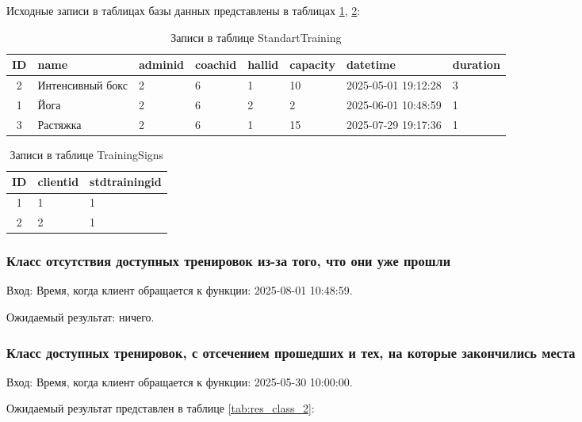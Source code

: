 Исходные записи в таблицах базы данных представлены в таблицах \ref{tab:StandartTraining_db_screen},
\ref{tab:trainingsigns_db_screen}:

\begin{table}[H]
	\centering
	\caption{Записи в таблице StandartTraining}
	\begin{tabular}{|c|p{2.7cm}|p{1.6cm}|p{1.6cm}|p{1.2cm}|p{1.6cm}|p{2.5cm}|p{1.6cm}|}
	\hline
	ID & name & adminid & coachid & hallid & capacity & datetime & duration \\
	\hline
	2 & Интенсивный бокс & 2 & 6 & 1 & 10 & 2025-05-01 19:12:28 & 3 \\
	\hline
	1 & Йога & 2 & 6 & 2 & 2 & 2025-06-01 10:48:59 & 1 \\
	\hline
	3 & Растяжка & 2 & 6 & 1 & 15 & 2025-07-29 19:17:36 & 1 \\
	\hline
	\end{tabular}
	\label{tab:StandartTraining_db_screen}
\end{table}

\begin{table}[H]
	\centering
	\caption{Записи в таблице TrainingSigns}
	\begin{tabular}{|c|p{7.5cm}|p{7.5cm}|}
	\hline
	ID & clientid & stdtrainingid \\
	\hline
	1 & 1 & 1 \\
	\hline
	2 & 2 & 1 \\
	\hline
	\end{tabular}
	\label{tab:trainingsigns_db_screen}
\end{table}

\subsubsection{Класс отсутствия доступных тренировок из-за того, что они уже прошли}

Вход: Время, когда клиент обращается к функции: 2025-08-01 10:48:59.

Ожидаемый результат: ничего.

\subsubsection{Класс доступных тренировок, с отсечением прошедших и тех, на которые закончились места}

Вход: Время, когда клиент обращается к функции: 2025-05-30 10:00:00.

Ожидаемый результат представлен в таблице \ref{tab:res_class_2}: 

